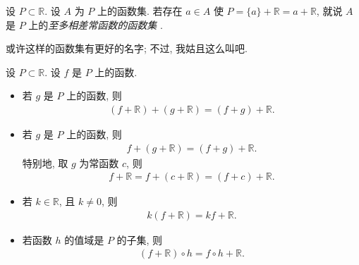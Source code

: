 \begin{definition}
    设 $P \subset \mathbb{R}$.
    设 $A$ 为 $P$ 上的函数集.
    若存在 $a \in A$ 使
    $P = \{ a \} + \mathbb{R} = a + \mathbb{R}$,
    就说 $A$ 是 $P$ 上的\emph{至多相差常函数的函数集}%
    .
\end{definition}

\begin{remark}
    或许这样的函数集有更好的名字;
    不过, 我姑且这么叫吧.
\end{remark}

\begin{theorem}
    设 $P \subset \mathbb{R}$.
    设 $f$ 是 $P$ 上的函数.
    \begin{itemize}
        \item 若 $g$ 是 $P$ 上的函数, 则
              \begin{align*}
                  (f + \mathbb{R}) + (g + \mathbb{R}) = (f + g) + \mathbb{R}.
              \end{align*}
        \item 若 $g$ 是 $P$ 上的函数, 则
              \begin{align*}
                  f + (g + \mathbb{R}) = (f + g) + \mathbb{R}.
              \end{align*}
              特别地, 取 $g$ 为常函数 $c$, 则
              \begin{align*}
                  f + \mathbb{R} = f + (c + \mathbb{R}) = (f + c) + \mathbb{R}.
              \end{align*}
        \item 若 $k \in \mathbb{R}$, 且 $k \neq 0$, 则
              \begin{align*}
                  k(f + \mathbb{R}) = kf + \mathbb{R}.
              \end{align*}
        \item 若函数 $h$ 的值域是 $P$ 的子集, 则
              \begin{align*}
                  (f + \mathbb{R}) \circ h = f \circ h + \mathbb{R}.
              \end{align*}
    \end{itemize}
\end{theorem}

